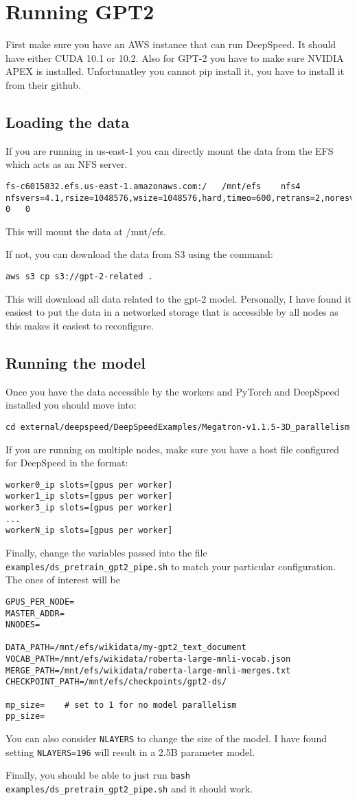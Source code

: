 \section{Running GPT2}
First make sure you have an AWS instance that can run DeepSpeed.
It should have either CUDA 10.1 or 10.2.
Also for GPT-2 you have to make sure NVIDIA APEX is installed.
Unfortunatley you cannot pip install it, you have to install it from their github.


\subsection{Loading the data}
If you are running in us-east-1 you can directly mount the data from the EFS which acts as an NFS server.
\begin{lstlisting}
fs-c6015832.efs.us-east-1.amazonaws.com:/   /mnt/efs    nfs4    nfsvers=4.1,rsize=1048576,wsize=1048576,hard,timeo=600,retrans=2,noresvport 0   0
\end{lstlisting}

This will mount the data at /mnt/efs.

If not, you can download the data from S3 using the command:
\begin{lstlisting}
aws s3 cp s3://gpt-2-related .
\end{lstlisting}

This will download all data related to the gpt-2 model.
Personally, I have found it easiest to put the data in a networked storage that
is accessible by all nodes as this makes it easiest to reconfigure.

\subsection{Running the model}
Once you have the data accessible by the workers and PyTorch and DeepSpeed
installed you should move into:
\begin{lstlisting}
cd external/deepspeed/DeepSpeedExamples/Megatron-v1.1.5-3D_parallelism
\end{lstlisting}

If you are running on multiple nodes, make sure you have a host file configured
for DeepSpeed in the format:
\begin{lstlisting}
worker0_ip slots=[gpus per worker]
worker1_ip slots=[gpus per worker]
worker3_ip slots=[gpus per worker]
...
workerN_ip slots=[gpus per worker]
\end{lstlisting}

Finally, change the variables passed into the file \lstinline|examples/ds_pretrain_gpt2_pipe.sh| to match your particular configuration.
The ones of interest will be
\begin{lstlisting}
GPUS_PER_NODE=
MASTER_ADDR=
NNODES=

DATA_PATH=/mnt/efs/wikidata/my-gpt2_text_document
VOCAB_PATH=/mnt/efs/wikidata/roberta-large-mnli-vocab.json
MERGE_PATH=/mnt/efs/wikidata/roberta-large-mnli-merges.txt
CHECKPOINT_PATH=/mnt/efs/checkpoints/gpt2-ds/

mp_size= 	# set to 1 for no model parallelism
pp_size=
\end{lstlisting}

You can also consider \lstinline|NLAYERS| to change the size of the model.
I have found setting \lstinline|NLAYERS=196| will result in a 2.5B parameter
model.

Finally, you should be able to just run
\lstinline|bash examples/ds_pretrain_gpt2_pipe.sh| and it should work.
